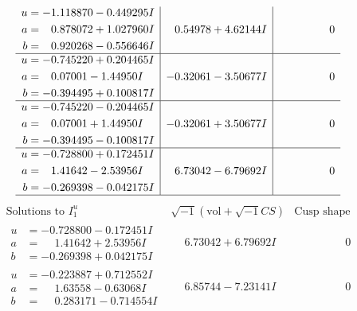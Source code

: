 \documentclass[1p]{elsarticle_modified}
\theoremstyle{definition}
\newcommand{\I}{\sqrt{-1}}
\begin{document}
$$\begin{array}{c|c|c}
\begin{aligned}
u &= -1.118870 - 0.449295 I \\
a &= \phantom{-}0.878072 + 1.027960 I \\
b &= \phantom{-}0.920268 - 0.556646 I\end{aligned}
 & \phantom{-}0.54978 + 4.62144 I & \phantom{-0.000000 } 0 \\ \hline\begin{aligned}
u &= -0.745220 + 0.204465 I \\
a &= \phantom{-}0.07001 - 1.44950 I \\
b &= -0.394495 + 0.100817 I\end{aligned}
 & -0.32061 - 3.50677 I & \phantom{-0.000000 } 0 \\ \hline\begin{aligned}
u &= -0.745220 - 0.204465 I \\
a &= \phantom{-}0.07001 + 1.44950 I \\
b &= -0.394495 - 0.100817 I\end{aligned}
 & -0.32061 + 3.50677 I & \phantom{-0.000000 } 0 \\ \hline\begin{aligned}
u &= -0.728800 + 0.172451 I \\
a &= \phantom{-}1.41642 - 2.53956 I \\
b &= -0.269398 - 0.042175 I\end{aligned}
 & \phantom{-}6.73042 - 6.79692 I & \phantom{-0.000000 } 0\\
 \hline 
 \end{array}$$\newpage$$\begin{array}{c|c|c}  
\text{Solutions to }I^u_{1}& \I (\text{vol} + \sqrt{-1}CS) & \text{Cusp shape}\\
 \hline 
\begin{aligned}
u &= -0.728800 - 0.172451 I \\
a &= \phantom{-}1.41642 + 2.53956 I \\
b &= -0.269398 + 0.042175 I\end{aligned}
 & \phantom{-}6.73042 + 6.79692 I & \phantom{-0.000000 } 0 \\ \hline\begin{aligned}
u &= -0.223887 + 0.712552 I \\
a &= \phantom{-}1.63558 - 0.63068 I \\
b &= \phantom{-}0.283171 - 0.714554 I\end{aligned}
 & \phantom{-}6.85744 - 7.23141 I & \phantom{-0.000000 } 0 \\ \hline\begin{aligned}

\end{aligned}
\end{array}$$
\end{document}
